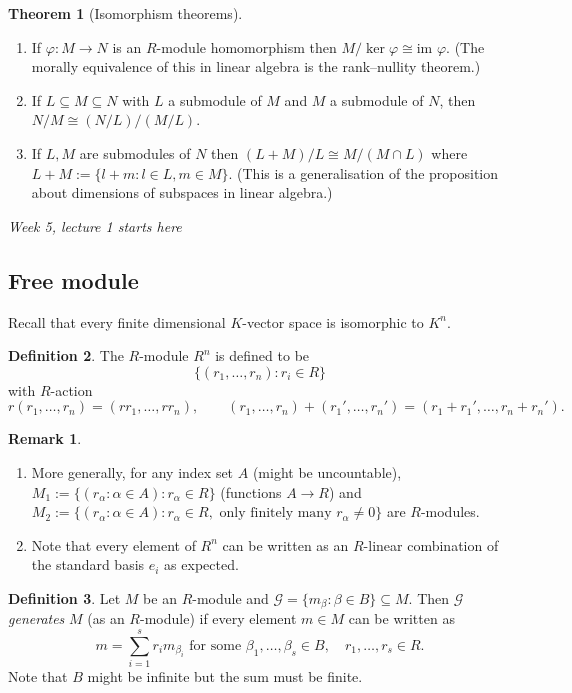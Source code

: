 \documentclass[a4paper]{article}
\newcommand{\im}{\text{im }}
\theoremstyle{definition}
\newtheorem{defn}{Definition}[subsection]
\newtheorem{thm}[defn]{Theorem}
\newtheorem*{remark}{Remark}
\begin{document}
\begin{thm}[Isomorphism theorems]
\begin{enumerate}
\item If $\varphi:M\rightarrow N$ is an $R$-module homomorphism then $M/\ker\varphi \cong \im \varphi$. (The morally equivalence of this in linear algebra is the rank–nullity theorem.)
\item If $L\subseteq M\subseteq N$ with $L$ a submodule of $M$ and $M$ a submodule of $N$, then $N/M\cong (N/L)/(M/L)$.
\item If $L,M$ are submodules of $N$ then $(L+M)/L\cong M/(M\cap L)$ where $L+M:=\{l+m:l\in L, m\in M\}$. (This is a generalisation of the proposition about dimensions of subspaces in linear algebra.)
\end{enumerate}
\end{thm}

\begin{flushright}
\textit{Week 5, lecture 1 starts here}
\end{flushright}

\subsection{Free module}
Recall that every finite dimensional $K$-vector space is isomorphic to $K^n$.
\begin{defn}
The $R$-module $R^n$ is defined to be
\[
\{(r_1,\ldots,r_n):r_i\in R\}
\]
with $R$-action
\[
r(r_1,\ldots,r_n)=(rr_1,\ldots,rr_n),\qquad (r_1,\ldots,r_n)+(r_1',\ldots,r_n')=(r_1+r_1',\ldots,r_n+r_n').
\]
\end{defn}

\begin{remark}
\begin{enumerate}
\item More generally, for any index set $A$ (might be uncountable), $M_1:=\{(r_\alpha:\alpha\in A):r_\alpha\in R\}$ (functions $A\rightarrow R$) and $M_2:=\{(r_\alpha:\alpha\in A):r_\alpha\in R,\text{ only finitely many }r_\alpha\neq 0\}$ are $R$-modules.
\item Note that every element of $R^n$ can be written as an $R$-linear combination of the standard basis $e_i$ as expected.
\end{enumerate}
\end{remark}

\begin{defn}
Let $M$ be an $R$-module and $\mathcal G=\{m_\beta:\beta\in B\}\subseteq M$. Then $\mathcal G$ \textit{generates} $M$ (as an $R$-module) if every element $m\in M$ can be written as
\[
m=\sum_{i=1}^s r_i m_{\beta_i} \text{ for some } \beta_1,\ldots,\beta_s\in B,\quad r_1,\ldots,r_s\in R.
\] 
Note that $B$ might be infinite but the sum must be finite.
\end{defn}
\end{document}

